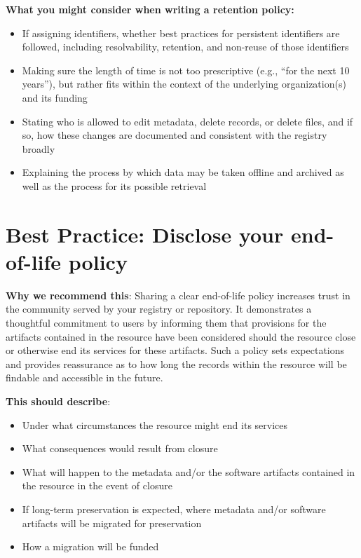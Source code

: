 \documentclass[11pt]{article}
\begin{document}
\textbf{What you might consider when writing a retention policy:}

\begin{itemize}
\item If assigning identifiers, whether best practices for persistent identifiers are followed, including resolvability, retention, and non-reuse of those identifiers

\item Making sure the length of time is not too prescriptive (e.g., ``for the next 10 years''), but rather fits within the context of the underlying organization(s) and its funding

\item Stating who is allowed to edit metadata, delete records, or delete files, and if so, how these changes are documented and consistent with the registry broadly

\item Explaining the process by which data may be taken offline and archived as well as the process for its possible retrieval

\end{itemize}


\section{Best Practice: Disclose your end-of-life policy}
\label{best-practice-disclose-your-end-of-life-policy}

\textbf{Why we recommend this}: Sharing a clear end-of-life policy increases trust in the community served by your registry or repository.  It demonstrates a thoughtful commitment to users by informing them that provisions for the artifacts contained in the resource have been considered should the resource close or otherwise end its services for these artifacts. Such a policy sets expectations and provides reassurance as to how long the records within the resource will be findable and accessible in the future.

\textbf{This should describe}:

\begin{itemize}
\item Under what circumstances the resource might end its services

\item What consequences would result from closure

\item What will happen to the metadata and/or the software artifacts contained in the resource in the event of closure

\item If long-term preservation is expected, where metadata and/or software artifacts will be migrated for preservation

\item How a migration will be funded

\end{itemize}
\end{document}
